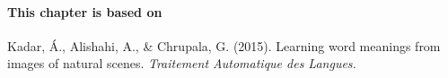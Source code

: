 \paragraph{This chapter is based on} Kadar, Á., Alishahi, A., \& Chrupala, G. (2015). 
Learning word meanings from images of natural scenes. \textit{Traitement Automatique des Langues.}

\newpage





%










%
%

%



%

